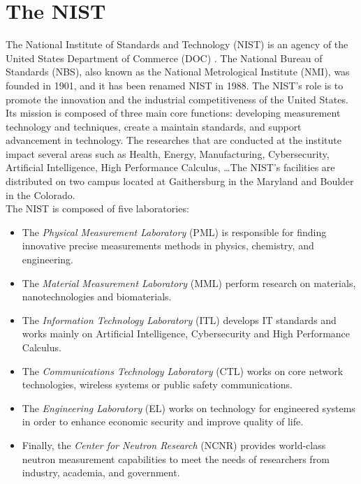 
\section{The NIST}

The National Institute of Standards and Technology (NIST) is an agency of the
United States Department of Commerce (DOC) \cite{enwiki:nist}. The National
Bureau of Standards (NBS), also known as the National Metrological Institute
(NMI), was founded in 1901, and it has been renamed NIST in 1988. The NIST's
role is to promote the innovation and the industrial competitiveness of the
United States. Its mission is composed of three main core functions: developing
measurement technology and techniques, create a maintain standards, and support
advancement in technology. The researches that are conducted at the institute
impact several areas such as Health, Energy, Manufacturing, Cybersecurity,
Artificial Intelligence, High Performance Calculus, \dots The NIST's facilities
are distributed on two campus located at Gaithersburg in the Maryland and
Boulder in the Colorado.\\

The NIST is composed of five laboratories:

\begin{itemize}
  \item The \textit{Physical Measurement Laboratory} (PML) is responsible for
    finding innovative precise measurements methods in physics, chemistry, and
    engineering.

  \item The \textit{Material Measurement Laboratory} (MML) perform research on
    materials, nanotechnologies and biomaterials.

  \item The \textit{Information Technology Laboratory} (ITL) develops IT
    standards and works mainly on Artificial Intelligence, Cybersecurity and
    High Performance Calculus.

  \item The \textit{Communications Technology Laboratory} (CTL) works on core
    network technologies, wireless systems or public safety communications.

  \item The \textit{Engineering Laboratory} (EL) works on technology for
    engineered systems in order to enhance economic security and improve quality
    of life.

  \item Finally, the \textit{Center for Neutron Research} (NCNR) provides
    world-class neutron measurement capabilities to meet the needs of
    researchers from industry, academia, and government.
\end{itemize}

